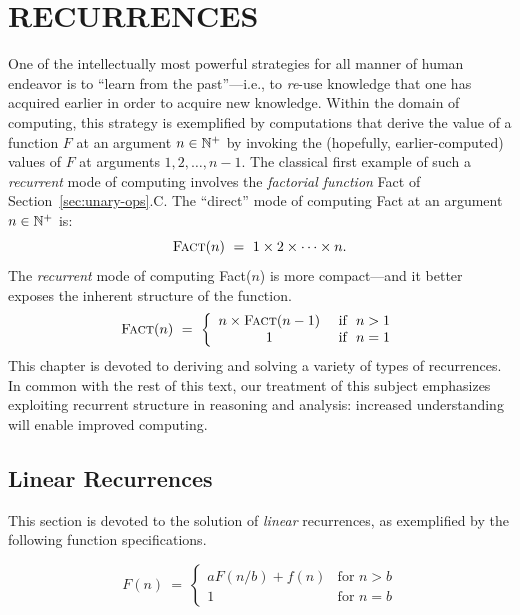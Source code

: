 
\chapter{RECURRENCES}
\label{ch:Recurrences}

One of the intellectually most powerful strategies for all manner of
human endeavor is to ``learn from the past''---i.e., to {\em re}-use
knowledge that one has acquired earlier in order to acquire new
knowledge.  Within the domain of computing, this strategy is
exemplified by computations that derive the value of a function $F$ at
an argument $n \in \mathbb{N}^+$ by invoking the (hopefully, earlier-computed)
values of $F$ at arguments $1, 2, \ldots, n-1$.  The classical first
example of such a {\it recurrent} mode of computing involves the {\it
  factorial function} {\sc Fact} of Section~\ref{sec:unary-ops}.C.
The ``direct'' mode of computing {\sc Fact} at an argument $n \in
\mathbb{N}^+$ is:
\[ \mbox{\sc Fact}(n) \ = \ 1 \times 2 \times \cdots \times n. \]
The {\em recurrent} mode of computing {\sc Fact}($n$) is more
compact---and it better exposes the inherent structure of the
function.
\[ \mbox{\sc Fact}(n) \ = \ \left\{
\begin{array}{cl}
 n \times \mbox{\sc Fact}(n-1) & \mbox{ if } \ n > 1 \\
 1 & \mbox{ if } \ n = 1 \\
\end{array}
\right.
\]
This chapter is devoted to deriving and solving a variety of types of
recurrences.  In common with the rest of this text, our treatment of
this subject emphasizes exploiting recurrent structure in reasoning
and analysis: increased understanding will enable improved computing.


\section{Linear Recurrences}
\label{sec:linear-recurrences}

This section is devoted to the solution of {\em linear} recurrences,
as exemplified by the following function specifications.  

\begin{equation}
\label{eq:Lin-Recur:general}
F(n) \ = \ \left\{
\begin{array}{cl}
a F(n/b) + f(n) & \mbox{for } n > b \\
1 & \mbox{for } n = b
\end{array}
\right.
\end{equation}

